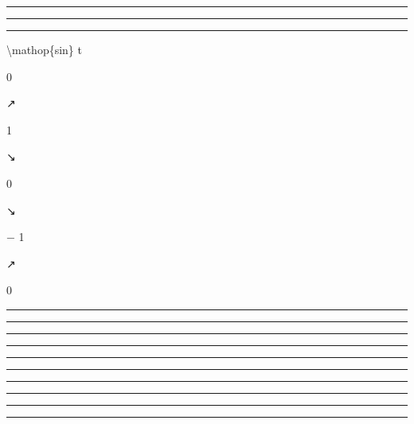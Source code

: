 \documentclass[]{article}
\begin{document}
\begin{center}\rule{3in}{0.4pt}\end{center}

\begin{center}\rule{3in}{0.4pt}\end{center}

\begin{center}\rule{3in}{0.4pt}\end{center}

\textbackslash{}mathop\{sin\} t

0

↗

1

↘

0

↘

− 1

↗

0

\begin{center}\rule{3in}{0.4pt}\end{center}

\begin{center}\rule{3in}{0.4pt}\end{center}

\begin{center}\rule{3in}{0.4pt}\end{center}

\begin{center}\rule{3in}{0.4pt}\end{center}

\begin{center}\rule{3in}{0.4pt}\end{center}

\begin{center}\rule{3in}{0.4pt}\end{center}

\begin{center}\rule{3in}{0.4pt}\end{center}

\begin{center}\rule{3in}{0.4pt}\end{center}

\begin{center}\rule{3in}{0.4pt}\end{center}

\begin{center}\rule{3in}{0.4pt}\end{center}
\end{document}
